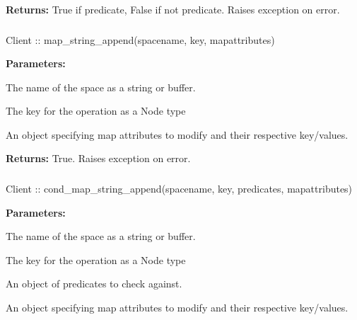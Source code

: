 \noindent\textbf{Returns:}
True if predicate, False if not predicate.  Raises exception on error.

\subsubsection{}
\label{api:nodejs:map_string_append}
\begin{javascriptcode}
Client :: map_string_append(spacename, key, mapattributes)
\end{javascriptcode}
\funcdesc 

\noindent\textbf{Parameters:}
\begin{description}[labelindent=\widthof{{\code{mapattributes}}},leftmargin=*,noitemsep,nolistsep,align=right]
\item[\code{spacename}] The name of the space as a string or buffer.
\item[\code{key}] The key for the operation as a Node type
\item[\code{mapattributes}] An object specifying map attributes to modify and their respective key/values.
\end{description}

\noindent\textbf{Returns:}
True.  Raises exception on error.

\subsubsection{}
\label{api:nodejs:cond_map_string_append}
\begin{javascriptcode}
Client :: cond_map_string_append(spacename, key, predicates, mapattributes)
\end{javascriptcode}
\funcdesc 

\noindent\textbf{Parameters:}
\begin{description}[labelindent=\widthof{{\code{mapattributes}}},leftmargin=*,noitemsep,nolistsep,align=right]
\item[\code{spacename}] The name of the space as a string or buffer.
\item[\code{key}] The key for the operation as a Node type
\item[\code{predicates}] An object of predicates to check against.
\item[\code{mapattributes}] An object specifying map attributes to modify and their respective key/values.
\end{description}

